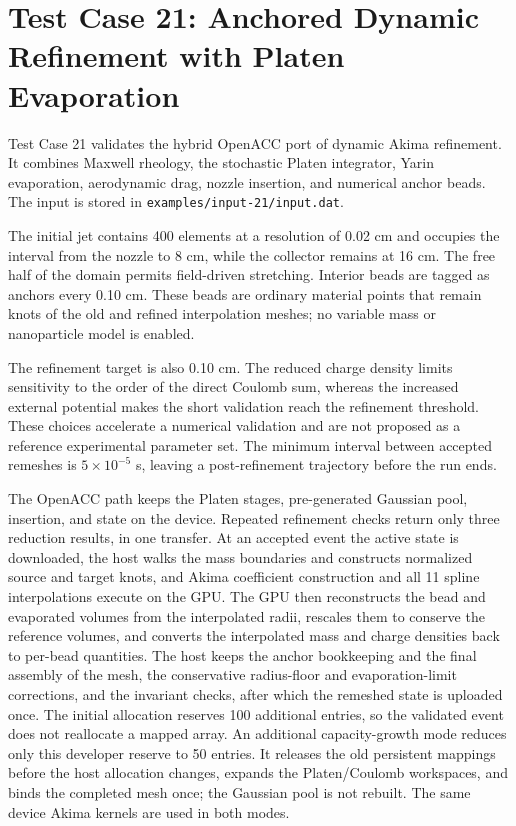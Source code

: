 \section{Test Case 21: Anchored Dynamic Refinement with Platen Evaporation}

Test Case 21 validates the hybrid OpenACC port of dynamic Akima refinement.
It combines Maxwell rheology, the stochastic Platen integrator,
Yarin evaporation, aerodynamic drag, nozzle insertion, and numerical anchor
beads. The input is stored in
\texttt{examples/input-21/input.dat}.

The initial jet contains 400 elements at a resolution of 0.02 cm and occupies
the interval from the nozzle to 8 cm, while the collector remains at 16 cm.
The free half of the domain permits field-driven stretching. Interior beads
are tagged as anchors every 0.10 cm. These beads are ordinary material points
that remain knots of the old and refined interpolation meshes; no variable
mass or nanoparticle model is enabled.

The refinement target is also 0.10 cm. The reduced charge density limits
sensitivity to the order of the direct Coulomb sum, whereas the increased
external potential makes the short validation reach the refinement threshold.
These choices accelerate a numerical validation and are not proposed as a
reference experimental parameter set. The minimum interval between accepted
remeshes is $5\times10^{-5}$ s, leaving a post-refinement trajectory before
the run ends.

The OpenACC path keeps the Platen stages, pre-generated Gaussian pool,
insertion, and state on the device. Repeated refinement checks return only
three reduction results, in one transfer. At an accepted event the active state is downloaded,
the host walks the mass boundaries and constructs normalized source and
target knots, and Akima coefficient construction and all 11 spline
interpolations execute on the GPU. The GPU then reconstructs the bead and
evaporated volumes from the interpolated radii, rescales them to conserve
the reference volumes, and converts the interpolated mass and charge
densities back to per-bead quantities. The host keeps the anchor bookkeeping
and the final assembly of the mesh, the conservative radius-floor and
evaporation-limit corrections, and the invariant checks, after which the
remeshed state is uploaded once. The
initial allocation reserves 100 additional entries, so the validated event
does not reallocate a mapped array. An additional capacity-growth mode reduces
only this developer reserve to 50 entries. It releases the old persistent
mappings before the host allocation changes, expands the Platen/Coulomb
workspaces, and binds the completed mesh once; the Gaussian pool is not
rebuilt. The same device
Akima kernels are used in both modes.


